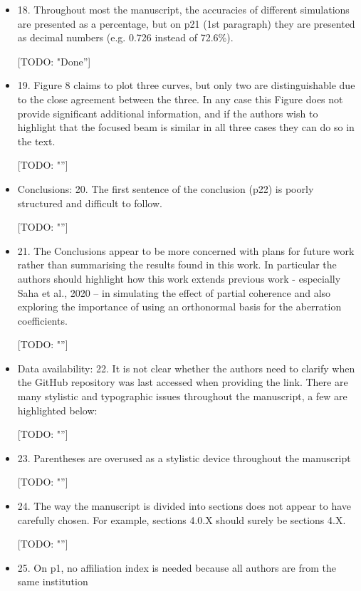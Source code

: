 \documentclass[11pt]{letter} %
\newcommand{\todo}[1]{{\color{red}[TODO: "#1'']}}
\begin{document}
\begin{letter}{}
\begin{itemize}
    \item 18. Throughout most the manuscript, the accuracies of different simulations are presented as a percentage, but on p21 (1st paragraph) they are presented as decimal numbers (e.g. 0.726 instead of 72.6\%).
    
    \todo{Done}
    
    \item 19. Figure 8 claims to plot three curves, but only two are distinguishable due to the close agreement between the three. In any case this Figure does not provide significant additional information, and if the authors wish to highlight that the focused beam is similar in all three cases they can do so in the text.
    
    \todo{}
    
    \item Conclusions: 20. The first sentence of the conclusion (p22) is poorly structured and difficult to follow.
    
    \todo{}
    
    \item 21. The Conclusions appear to be more concerned with plans for future work rather than summarising the results found in this work. In particular the authors should highlight how this work extends previous work - especially Saha et al., 2020 – in simulating the effect of partial coherence and also exploring the importance of using an orthonormal basis for the aberration coefficients.
    
    \todo{}
    
    \item Data availability: 22. It is not clear whether the authors need to clarify when the GitHub repository was last accessed when providing the link. There are many stylistic and typographic issues throughout the manuscript, a few are highlighted below:
    
    \todo{}
    
    \item 23. Parentheses are overused as a stylistic device throughout the manuscript
    
    \todo{}
    
    \item 24. The way the manuscript is divided into sections does not appear to have carefully chosen. For example, sections 4.0.X should surely be sections 4.X.
    
    \todo{}
    
    \item 25. On p1, no affiliation index is needed because all authors are from the same institution
    

\end{itemize}
\end{letter}
\end{document}
